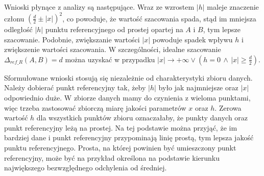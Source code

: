 Wnioski płynące z analizy są następujące. Wraz ze wzrostem $ |h| $ maleje znaczenie członu $ (\frac{d}{2} \pm |x|)^2 $, co powoduje, że wartość szacowania spada, stąd im mniejsza odległość $ |h| $ punktu referencyjnego od prostej opartej na $ A $ i $ B $, tym lepsze szacowanie. Podobnie, zwiększanie wartości $ |x| $ powoduje spadek wpływu $ h $ i zwiększenie wartości szacowania. W szczególności, idealne szacowanie $ \Delta_{ref\_R}(A,B) = d $ można uzyskać w przypadku $ |x| \to +\infty \lor (h=0 \,\land\, |x| \ge \frac{d}{2}) $.\par
Sformułowane wnioski stosują się niezależnie od charakterystyki zbioru danych. Należy dobierać punkt referencyjny tak, żeby $ |h| $ było jak najmniejsze oraz $ |x| $ odpowiednio duże. W zbiorze danych mamy do czynienia z wieloma punktami, więc trzeba zastosować zbiorczą miarę jakości parametrów $ x $ oraz $ h $. Zerowa wartość $ h $ dla wszystkich punktów zbioru oznaczałaby, że punkty danych oraz punkt referencyjny leżą na prostej. Na tej podstawie można przyjąć, że im bardziej dane i punkt referencyjny przypominają linię prostą, tym lepsza jakość punktu referencyjnego. Prosta, na której powinien być umieszczony punkt referencyjny, może być na przykład określona na podstawie kierunku największego bezwzględnego odchylenia od średniej.

